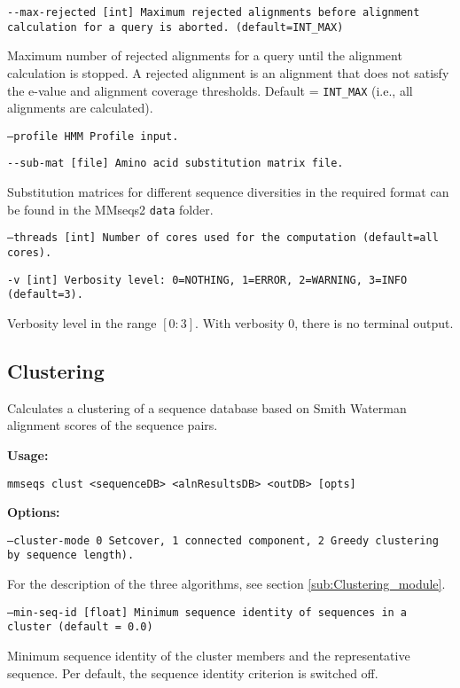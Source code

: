 \documentclass[11pt,a4paper]{scrreprt}
\begin{document}
\texttt{\small -{}-max-rejected {[}int{]} Maximum rejected alignments before alignment calculation for a query is aborted. (default=INT\_MAX)}{\small \par}

Maximum number of rejected alignments for a query until the alignment calculation is stopped. A rejected alignment is an alignment that does not satisfy the e-value and alignment coverage thresholds. Default = \texttt{INT\_MAX} (i.e., all alignments are calculated).

\texttt{\small --profile HMM Profile input.}{\small \par}

\texttt{\small -{}-sub-mat {[}file{]} Amino acid substitution matrix file.}{\small \par}

Substitution matrices for different sequence diversities in the required format can be found in the MMseqs2 \texttt{data} folder.

\texttt{\small --threads {[}int{]} Number of cores used for the computation (default=all cores).}{\small \par}

\texttt{\small -v {[}int{]} Verbosity level: 0=NOTHING, 1=ERROR, 2=WARNING, 3=INFO (default=3).}{\small \par}

Verbosity level in the range $[0:3]$. With verbosity $0$, there is no terminal output.
\subsection{Clustering}
Calculates a clustering of a sequence database based on Smith Waterman alignment scores of the sequence pairs.

\textbf{Usage:}

\texttt{mmseqs clust <sequenceDB> <alnResultsDB> <outDB> {[}opts{]}}

\textbf{Options:}

\texttt{\small --cluster-mode 0 Setcover, 1 connected component, 2 Greedy clustering by sequence length).}{\small \par}

For the description of the three algorithms, see section \ref{sub:Clustering_module}.

\texttt{\small --min-seq-id {[}float{]} Minimum sequence identity of sequences in a cluster (default = 0.0)}{\small \par}

Minimum sequence identity of the cluster members and the representative sequence. Per default, the sequence identity criterion is switched off.
\end{document}
